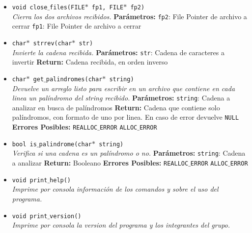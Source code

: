\documentclass[a4paper, 10pt]{article}
\def\code#1{\texttt{#1}}
\begin{document}
\begin{itemize}
				\item \code{void close$\_$files(FILE$*$ fp1, FILE$*$ fp2)} 
				\\\textit{Cierra los dos archivos recibidos.}
					\subitem \textbf{Parámetros:} 
						\subsubitem \code{fp2}: File Pointer de archivo a cerrar
						\subsubitem \code{fp1}: File Pointer de archivo a cerrar
										
				\item \code{char$*$ strrev(char$*$ str)} 
				\\\textit{Invierte la cadena recibida.}
					\subitem \textbf{Parámetros:} 
						\subsubitem \code{str}: Cadena de caracteres a invertir
					\subitem \textbf{Return:} 
						\subsubitem Cadena recibida, en orden inverso
						
				\item \code{char$*$ get$\_$palindromes(char$*$ string)} 
				\\\textit{Devuelve un arreglo listo para escribir en un archivo 
				que contiene en cada linea un palíndromo del string recibido.}
					\subitem \textbf{Parámetros:} 
						\subsubitem \code{string}: Cadena a analizar en busca de palíndromos
					\subitem \textbf{Return:} 
						\subsubitem Cadena que contiene solo palíndromos, con 
						formato de uno por linea. En caso de error devuelve \code{NULL}
					\subitem \textbf{Errores Posibles:} 
						\subsubitem \code{REALLOC$\_$ERROR} 
						\subsubitem \code{ALLOC$\_$ERROR}						
						
				\item \code{bool is$\_$palindrome(char$*$ string)} 
				\\\textit{Verifica si una cadena es un palíndromo o no.}
					\subitem \textbf{Parámetros:} 
						\subsubitem \code{string}: Cadena a analizar
					\subitem \textbf{Return:} 
						\subsubitem Booleano
					\subitem \textbf{Errores Posibles:} 
						\subsubitem \code{REALLOC$\_$ERROR} 
						\subsubitem \code{ALLOC$\_$ERROR}
						
				\item \code{void print$\_$help()} 
				\\\textit{Imprime por consola información de los comandos y sobre el
				uso del programa.}
				
				\item \code{void print$\_$version()} 
				\\\textit{Imprime por consola la version del programa y los integrantes del grupo.}
				

\end{itemize}
\end{document}
